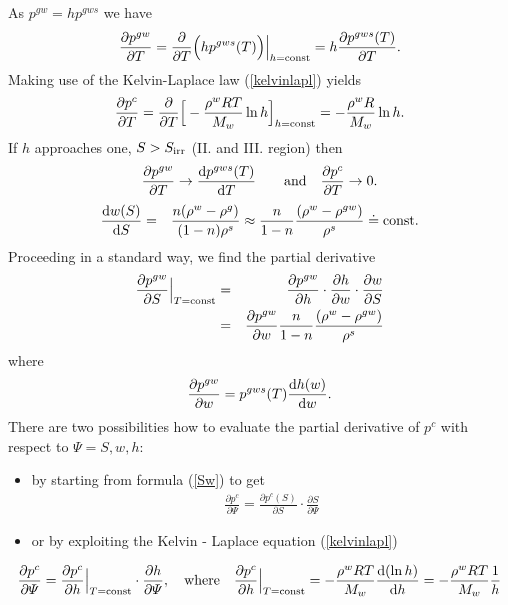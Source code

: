 As $p^{gw} = h p^{gws}$ we have
\begin{eqnarray}
\frac{\partial p^{gw}}{\partial T} = \frac{\partial}{\partial T} \Big(h p^{gws}(T)\Big)\Big|_{h = {\rm const}} 
= h \frac{\partial p^{gws}(T)}{\partial T}.
\end{eqnarray}
Making use of the Kelvin-Laplace law (\ref{kelvinlapl}) yields
\begin{eqnarray}
\frac{\partial p^{c}}{\partial T} = \frac{\partial}{\partial T} \Big[-\frac{\rho^w R T}{M_w}\ln h \Big]_{h = {\rm const}} 
= -\frac{\rho^w R}{M_w}\ln h.
\end{eqnarray}
If $h$ approaches one, $S > S_{\rm irr}$ (II. and III. region) then 
\begin{eqnarray}\label{region}
\frac{\partial p^{gw}}{\partial T} \rightarrow \frac{{\rm d} p^{gws}(T)}{{\rm d} T} 
\qquad {\rm and} \quad \frac{\partial p^{c}}{\partial T}\rightarrow 0.
\end{eqnarray}
\begin{eqnarray}
\frac{{\rm d} w(S)}{{\rm d} S}  &=& \frac{n(\rho^w - \rho^g)}{(1-n)\rho^s} 
\approx \frac{n}{1-n}\frac{(\rho^w - \rho^{gw})}{\rho^s} \doteq {\rm const}.
\end{eqnarray}
Proceeding in a standard way, we find the partial derivative
\begin{eqnarray}
\frac{\partial p^{gw}}{\partial S}\Big|_{T = {\rm const}} &=& 
\frac{\partial p^{gw}}{\partial h} \cdot \frac{\partial h}{\partial w}
\cdot \frac{\partial w}{\partial S}\nonumber\\
&=& \frac{\partial p^{gw}}{\partial w} \frac{n}{1-n}\frac{(\rho^w - \rho^{gw})}{\rho^s}
\end{eqnarray}
where
\begin{eqnarray}
\frac{\partial p^{gw}}{\partial w} = p^{gws}(T) \frac{{\rm d} h(w)}{{\rm d} w}.
\end{eqnarray}
There are two possibilities how to evaluate the partial derivative of $p^c$ with respect to $\varPsi = S, w, h$:
\begin{itemize}
\item{by starting from formula (\ref{Sw}) to get}
\begin{eqnarray}
\frac{\partial p^{c}}{\partial \varPsi} = \frac{\partial p^{c}(S)}{\partial S} \cdot \frac{\partial S}{\partial \varPsi}
\end{eqnarray}
\item{or by exploiting the Kelvin - Laplace equation (\ref{kelvinlapl})}
\end{itemize}
\begin{eqnarray}
\frac{\partial p^{c}}{\partial \varPsi} = \frac{\partial p^{c}}{\partial h}\Big|_{T = {\rm const}} 
\cdot \frac{\partial h}{\partial \varPsi},
\quad {\rm where} \quad \frac{\partial p^{c}}{\partial h}\Big|_{T = {\rm const}} = -\frac{\rho^w R T}{M_w} 
\frac{{\rm d}(\ln h)}{{\rm d} h} = 
- \frac{\rho^w R T}{M_w} \frac{1}{h}
\end{eqnarray}

